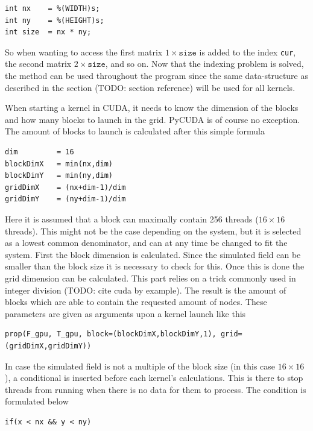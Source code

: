 \begin{verbatim}
int nx    = %(WIDTH)s;
int ny    = %(HEIGHT)s;
int size  = nx * ny;
\end{verbatim}

So when wanting to access the first matrix $1 \times \mathrm{\texttt{size}}$ is added to the index \texttt{cur}, the second matrix $2 \times \mathrm{\texttt{size}}$, and so on. Now that the indexing problem is solved, the method can be used throughout the program since the same data-structure as described in the section (TODO: section reference) will be used for all kernels.

When starting a kernel in CUDA, it needs to know the dimension of the blocks and how many blocks to launch in the grid. PyCUDA is of course no exception. The amount of blocks to launch is calculated after this simple formula

\begin{verbatim}
dim         = 16
blockDimX   = min(nx,dim)
blockDimY   = min(ny,dim)
gridDimX    = (nx+dim-1)/dim
gridDimY    = (ny+dim-1)/dim
\end{verbatim}

Here it is assumed that a block can maximally contain 256 threads ($16\times16$ threads). This might not be the case depending on the system, but it is selected as a lowest common denominator, and can at any time be changed to fit the system. First the block dimension is calculated. Since the simulated field can be smaller than the block size it is necessary to check for this. Once this is done the grid dimension can be calculated. This part relies on a trick commonly used in integer division (TODO: cite cuda by example). The result is the amount of blocks which are able to contain the requested amount of nodes. These parameters are given as arguments upon a kernel launch like this

\begin{verbatim}
prop(F_gpu, T_gpu, block=(blockDimX,blockDimY,1), grid=(gridDimX,gridDimY))
\end{verbatim}

In case the simulated field is not a multiple of the block size (in this case $16\times16$), a conditional is inserted before each kernel's calculations. This is there to stop threads from running when there is no data for them to process. The condition is formulated below

\begin{verbatim}
if(x < nx && y < ny)
\end{verbatim}

